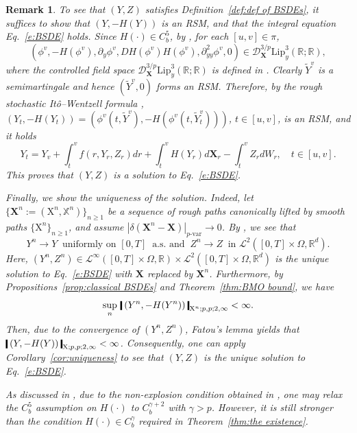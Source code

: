 \documentclass[11pt,reqno]{amsart}
\newtheorem{remark}[lemma]{Remark}
\numberwithin{equation}{section}
\def\R{\mathbb R}
\newcommand{\shortthickbar}{%
  \vcenter{\hbox{\rule{1.8pt}{2.2ex}}}%
}
\newcommand{\thicknm}[1]{%
  \mathopen{\shortthickbar}%
  \mkern4mu #1 \mkern4mu%
  \mathclose{\shortthickbar}%
}
\begin{document}
\begin{remark}
To see that $(Y,Z)$ satisfies Definition~\ref{def:def of BSDEs}, it suffices to show that $(Y,-H(Y))$ is an \emph{RSM}, and that the integral equation Eq.~\eqref{e:BSDE} holds. Since $H(\bm\cdot) \in C^{5}_b$, by \cite[Example~3.16]{dause2026controlled}, for each $[u,v] \in \pi$, 
\begin{equation*}
(\phi^{v}, - H(\phi^v), \partial_y \phi^v, D H(\phi^v) H(\phi^v), \partial^2_{yy} \phi^{v} ,0) \in \mathcal D^{3/p}_{\mathbf X} \mathrm{Lip}^3_y (\R; \R),
\end{equation*}
where the controlled field space $\mathcal D^{3/p}_{\mathbf X} \mathrm{Lip}^3_y (\R; \R)$ is defined in \cite[Definition~3.6]{dause2026controlled}. Clearly $\tilde Y^v$ is a semimartingale and hence $(\tilde Y^v, 0)$ forms an \emph{RSM}. Therefore, by the rough stochastic It\^o--Wentzell formula \cite[Theorem~4.16]{dause2026controlled}, $(Y_t,-H(Y_t)) = (\phi^{v}(t,\tilde Y^{v}), -H(\phi^v(t,\tilde Y^{v}_t)) )$, $t\in[u,v]$, is an \emph{RSM}, and it holds 
\begin{equation*}
Y_t = Y_v + \int_{t}^{v} f(r, Y_r, Z_r) dr + \int_t^v H(Y_r) d\mathbf X_r - \int_t^v Z_r dW_r,\quad t \in [u,v]. 
\end{equation*}
This proves that $(Y,Z)$ is a solution to Eq.~\eqref{e:BSDE}. 

Finally, we show the uniqueness of the solution. Indeed, let $\{\mathbf X^n:=(\mathrm X^n , \mathbb X^n)\}_{n\ge 1} $ be a sequence of rough paths canonically lifted by smooth paths $\{\mathrm X^n\}_{n\ge 1}$, and assume $|\delta( \mathbf X^n - \mathbf X )|_{p\text{-}\mathrm{var}}\to 0$. By \cite[Theorem~3]{DF}, we see that 
\begin{equation*}
Y^n \to Y \ \text{ uniformly on }[0,T]\ \text{ a.s. and }\ Z^n \to Z \ \text{ in }\mathcal L^2([0,T]\times \Omega,\R^d). 
\end{equation*}
Here, $(Y^n,Z^n) \in \mathcal L^{\infty}([0,T]\times \Omega,\R) \times \mathcal L^{2}([0,T]\times \Omega,\R^d)$ is the unique solution to Eq.~\eqref{e:BSDE} with $\mathbf X$ replaced by $\mathbf X^n$. Furthermore, by Propositions~\ref{prop:classical BSDEs} and Theorem~\ref{thm:BMO bound}, we have 
\begin{equation*}
\sup_{n} \, \, \thicknm{(Y^n,-H(Y^n)) }_{\mathrm X^n;p,p;2,\infty} < \infty.
\end{equation*}
Then, due to the convergence of $(Y^n,Z^n)$, Fatou's lemma yields that $\thicknm{(Y,-H(Y)) }_{\mathrm X;p,p;2,\infty} < \infty$. Consequently, one can apply Corollary~\ref{cor:uniqueness} to see that $(Y,Z)$ is the unique solution to Eq.~\eqref{e:BSDE}. 

As discussed in \cite[Remark~3.17]{dause2026controlled}, due to the non-explosion condition obtained in \cite[Chapter~11]{friz2010multidimensional}, one may relax the $C^5_b$ assumption on $H(\bm\cdot)$ to $C^{\gamma + 2}_b$ with $\gamma > p$. However, it is still stronger than the condition $H(\bm\cdot) \in C^{\gamma}_b$ required in Theorem~\ref{thm:the existence}. 
\end{remark}
\end{document}

